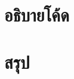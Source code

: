 \documentclass[10pt]{report}
\begin{document}
\chapter{อธิบายโค้ด}


\newpage


\newpage

\chapter{สรุป}

\newpage


\newpage
\end{document}
